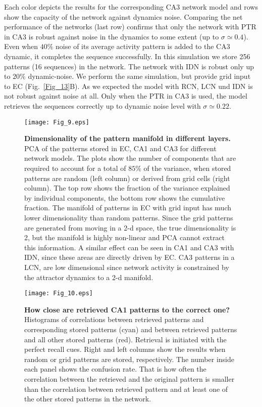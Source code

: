 \documentclass[utf8]{frontiersSCNS} %
\begin{document}
Each color depicts the results for the corresponding CA3 network model and rows show the capacity of the network against dynamics noise.  
Comparing the net performance of the networks (last row) confirms that only the network with PTR in CA3 is robust against noise in the dynamics to some extent (up to $\sigma \simeq 0.4$). Even when $ 40 \% $ noise of its average activity pattern is added to the CA3 dynamic, it completes the sequence successfully. In this simulation we store 256 patterns (16 sequences) in the network. The network with IDN is robust only up to $ 20 \% $ dynamic-noise.    
We perform the same simulation, but provide grid input to EC (Fig.~\ref{Fig_13}B). As we expected the model with RCN, LCN und IDN is not robust against noise at all. Only when the PTR in CA3 is used, the model retrieves the sequences correctly up to dynamic noise level with $\sigma \simeq 0.22$.



\begin{figure}[!htb]
\centering\texttt{[image: Fig\_9.eps]}
\caption{\textbf{Dimensionality of the pattern manifold in different layers.} PCA of the patterns stored in EC, CA1 and CA3 for different network models. The plots show the number of components that are required to account for a total of $85 \%$ of the variance, when stored patterns are random (left column) or derived from grid cells (right column). The top row shows the fraction of the variance explained by individual components, the bottom row shows the cumulative fraction. The manifold of patterns in EC with grid input has much lower dimensionality than random patterns. Since the grid patterns are generated from moving in a 2-d space, the true dimensionality is 2, but the manifold is highly non-linear and PCA cannot extract this information. A similar effect can be seen in CA1 and CA3 with IDN, since these areas are directly driven by EC. CA3 patterns in a LCN, are low dimensional since network activity is constrained by the attractor dynamics to a 2-d manifold.}
\label{Fig_9}
\end{figure}


\begin{figure}[!htb]
\centering\texttt{[image: Fig\_10.eps]}
\caption{\textbf{How close are retrieved CA1 patterns to the correct one?} Histograms of correlations between retrieved patterns and corresponding stored patterns (cyan) and between retrieved patterns and all other stored patterns (red). Retrieval is initiated with the perfect recall cues. Right and left columns show the results when random or grid patterns are stored, respectively. The number inside each panel shows the confusion rate. That is how often the correlation between the retrieved and the original pattern is smaller than the correlation between retrieved pattern and at least one of the other stored patterns in the network.} 
\label{Fig_10}
\end{figure}
\end{document}
